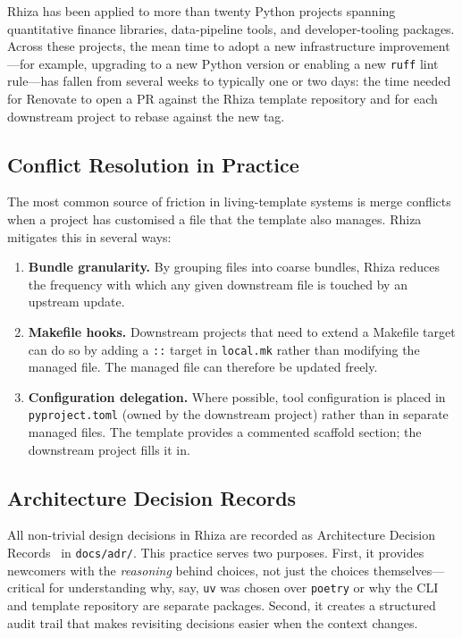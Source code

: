 \documentclass[12pt,a4paper]{article}
\begin{document}
Rhiza has been applied to more than twenty Python projects spanning quantitative finance libraries, data-pipeline tools, and developer-tooling packages. Across these projects, the mean time to adopt a new infrastructure improvement---for example, upgrading to a new Python version or enabling a new \texttt{ruff} lint rule---has fallen from several weeks to typically one or two days: the time needed for Renovate to open a PR against the Rhiza template repository and for each downstream project to rebase against the new tag.

\subsection{Conflict Resolution in Practice}

The most common source of friction in living-template systems is merge conflicts when a project has customised a file that the template also manages. Rhiza mitigates this in several ways:

\begin{enumerate}[leftmargin=*]
  \item \textbf{Bundle granularity.} By grouping files into coarse bundles, Rhiza reduces the frequency with which any given downstream file is touched by an upstream update.
  \item \textbf{Makefile hooks.} Downstream projects that need to extend a Makefile target can do so by adding a \texttt{::} target in \texttt{local.mk} rather than modifying the managed file. The managed file can therefore be updated freely.
  \item \textbf{Configuration delegation.} Where possible, tool configuration is placed in \texttt{pyproject.toml} (owned by the downstream project) rather than in separate managed files. The template provides a commented scaffold section; the downstream project fills it in.
\end{enumerate}

\subsection{Architecture Decision Records}

All non-trivial design decisions in Rhiza are recorded as Architecture Decision Records~\cite{nygard2011adr} in \texttt{docs/adr/}. This practice serves two purposes. First, it provides newcomers with the \emph{reasoning} behind choices, not just the choices themselves---critical for understanding why, say, \texttt{uv} was chosen over \texttt{poetry} or why the CLI and template repository are separate packages. Second, it creates a structured audit trail that makes revisiting decisions easier when the context changes.
\end{document}
